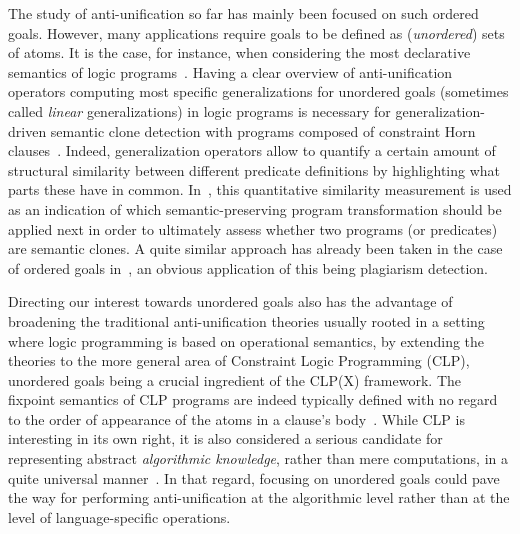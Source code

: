 The study of anti-unification so far has mainly been focused on such ordered goals. However, many applications require goals to be defined as (\textit{unordered}) sets of atoms. It is the case, for instance, when considering the most declarative semantics of logic programs~\cite{lp-semantics,clp-semantics,horn-clauses-intermediate-representation}. Having a clear overview of anti-unification operators computing most specific generalizations for unordered goals (sometimes called \textit{linear} generalizations) in logic programs is necessary for generalization-driven semantic
clone detection with programs composed of constraint Horn clauses~\cite{clones,DBLP:conf/ppdp/MesnardPV16}. Indeed, generalization operators allow to quantify a certain amount of structural similarity between different predicate definitions by highlighting what parts these have in common. In~\cite{clones}, this quantitative similarity measurement is used as an indication of which semantic-preserving program transformation should be applied next in order to ultimately assess whether two programs (or predicates) are semantic clones. A quite similar approach has already been taken in the case of ordered goals in~\cite{au-applications}, an obvious application of this being plagiarism detection. 

Directing our interest towards unordered goals also has the advantage of broadening the traditional anti-unification theories usually rooted in a setting where logic programming is based on operational semantics, by extending the theories to the more general area of Constraint Logic Programming (CLP), unordered goals being a crucial ingredient of the CLP(X) framework. The fixpoint semantics of CLP programs are indeed typically defined with no regard to the order of appearance of the atoms in a clause's body~\cite{clp-semantics}. While CLP is interesting in its own right, it is also considered a serious candidate for representing abstract \textit{algorithmic knowledge}, rather than mere computations, in a quite universal manner~\cite{horn-clauses-intermediate-representation}. In that regard, focusing on unordered goals could pave the way for performing anti-unification at the algorithmic level rather than at the level of language-specific operations. 


